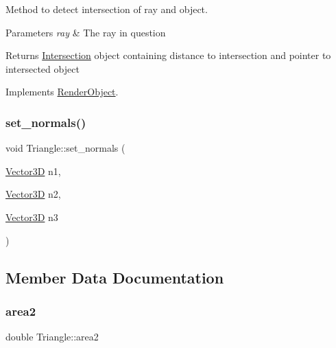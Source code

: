 Method to detect intersection of ray and object. 


\begin{DoxyParams}{Parameters}
{\em ray} & The ray in question \\
\hline
\end{DoxyParams}
\begin{DoxyReturn}{Returns}
\mbox{\hyperlink{classIntersection}{Intersection}} object containing distance to intersection and pointer to intersected object 
\end{DoxyReturn}


Implements \mbox{\hyperlink{classRenderObject_aa844ad2c5ef0c2b79faef2ed0af553bb}{Render\+Object}}.

\mbox{\label{classTriangle_a884c08e85751ea6204351718d3411034}} 
\subsubsection{\texorpdfstring{set\_normals()}{set\_normals()}}
{\footnotesize\ttfamily void Triangle\+::set\+\_\+normals (\begin{DoxyParamCaption}\item[{\mbox{\hyperlink{classVector3D}{Vector3D}}}]{n1,  }\item[{\mbox{\hyperlink{classVector3D}{Vector3D}}}]{n2,  }\item[{\mbox{\hyperlink{classVector3D}{Vector3D}}}]{n3 }\end{DoxyParamCaption})}



\subsection{Member Data Documentation}
\mbox{\label{classTriangle_a43322fb75910877dd63b17d391e3022b}} 
\subsubsection{\texorpdfstring{area2}{area2}}
{\footnotesize\ttfamily double Triangle\+::area2\hspace{0.3cm}{\ttfamily [private]}}

\mbox{\label{classTriangle_ac5b18fe5f9ea12fb717e3306c300527d}} 
